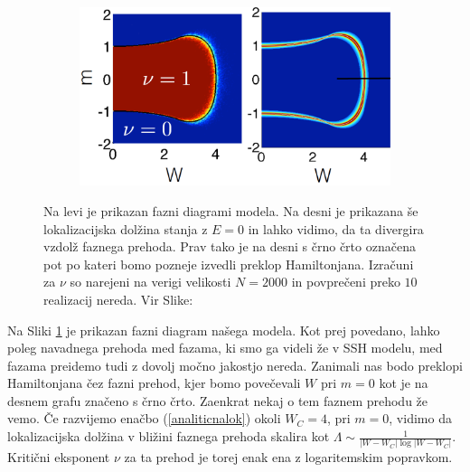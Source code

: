 \begin{figure}[H]
\centering
\begin{subfigure}{.7\textwidth}
\includegraphics[width=\linewidth]{Figures/CriticalSurface.png}
\end{subfigure}
\caption{Na levi je prikazan fazni diagrami modela. Na desni je prikazana še lokalizacijska dolžina stanja z $E=0$ in lahko vidimo, da ta divergira vzdolž faznega prehoda. Prav tako je na desni s črno črto označena pot po kateri bomo pozneje izvedli preklop Hamiltonjana. Izračuni za $\nu$ so narejeni na verigi velikosti $N=2000$ in povprečeni preko $10$ realizacij nereda. Vir Slike: \cite{mondragon}}
\label{fig:CriticalSurface}
\end{figure}

Na Sliki \ref{fig:CriticalSurface} je prikazan fazni diagram našega modela. Kot prej povedano, lahko poleg navadnega prehoda med fazama, ki smo ga videli že v SSH modelu, med fazama preidemo tudi z dovolj močno jakostjo nereda. Zanimali nas bodo preklopi Hamiltonjana čez fazni prehod, kjer bomo povečevali $W$ pri $m=0$ kot je na desnem grafu značeno s črno črto.
Zaenkrat nekaj o tem faznem prehodu že vemo. Če razvijemo enačbo (\ref{analiticnalok}) okoli $W_C=4$, pri $m=0$, vidimo da lokalizacijska dolžina v bližini faznega prehoda skalira kot $\Lambda \sim \frac{1}{|W-W_C| \log |W-W_C|}$. Kritični eksponent $\nu$ za ta prehod je torej enak ena z logaritemskim popravkom.

